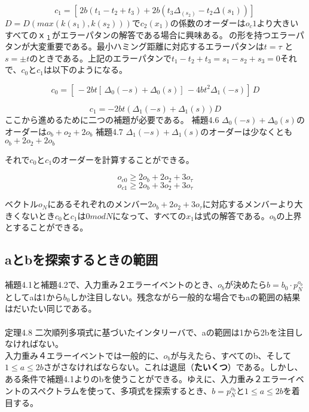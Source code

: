 \documentclass[24 pts]{article}
\begin{document}
\begin{equation}\tag{31}
c_1=[\, 2b(t_1-t_2+t_3)+2b(t_3\Delta_(s_2)-t_2\Delta(s_1))]\,
\end{equation}
$D=D(max⁡(k(s_1) ,k(s_2)))$で$c_2 (x_1)$の係数のオーダーは$o_c1$より大きいすべての$ｘ_１$がエラーパタンの解答である場合に興味ある。\newline
[\,2t,t,-t,s,-s,2s]\,の形を持つエラーパタンが大変重要である。最小ハミング距離に対応するエラーパタンは$t=\tau$ と
$s=\pm t$のときである。上記のエラーパタンで$t_1-t_2+t_3=s_1-s_2+s_3=0$それで、$c_0$と$c_1$は以下のようになる。

\begin{equation}\tag{32}
c_0=\left[\,-2bt[\,\Delta_0(-s)+\Delta_0(s)]\,-4bt^2\Delta_1(-s)\right]\,D
\end{equation}

\begin{equation}\tag{33}
c_1=-2bt(\Delta_1(-s)+\Delta_1(s))D
\end{equation}
ここから進めるために二つの補題が必要である。
補題4.6
$\Delta_0 (-s)+\Delta_0 (s)$のオーダーは$o_b +o_2+2o_b$
補題4.7
$\Delta_1 (-s)+\Delta_1 (s)$のオーダーは少なくとも$o_b +2o_2+2o_b$

それで$c_0$と$c_1$のオーダーを計算することができる。

$$o_{c0}\geq2o_b+2o_2+3o_\tau$$
$$o_{c1}\geq2o_b+3o_2+3o_\tau$$

ベクトル$o_N$にあるそれぞれのメンバー$2o_b+2o_2+3o_\tau$に対応するメンバーより大きくないとき$c_0$と$c_1$は$0modN$になって、すべての$x_1$は式の解答である。$o_b$の上界とすることができる。

\subsection{aとbを探索するときの範囲}
補題4.1と補題4.2で、入力重み２エラーイベントのとき、$o_b$が決めたら$b=b_0 \cdot p_N^{o_b}$としてaは1から$b_0$しか注目しない。残念ながら一般的な場合でもaの範囲の結果はだいたい同じである。
\paragraph{}
定理4.8
二次順列多項式に基づいたインタリーバで、aの範囲は1から2bを注目しなければない。\\
入力重み４エラーイベントでは一般的に、$o_b$が与えたら、すべてのb、そして$1\leq a\leq 2b$さがさなければならない。これは退屈（\textbf{たいくつ}）である。しかし、ある条件で補題4.1よりのbを使うことができる。ゆえに、入力重み２エラーイベントのスペクトラムを使って、多項式を探索するとき、$b=p_N^{o_b}$と$1\leq a\leq 2b$を着目する。
\end{document}
